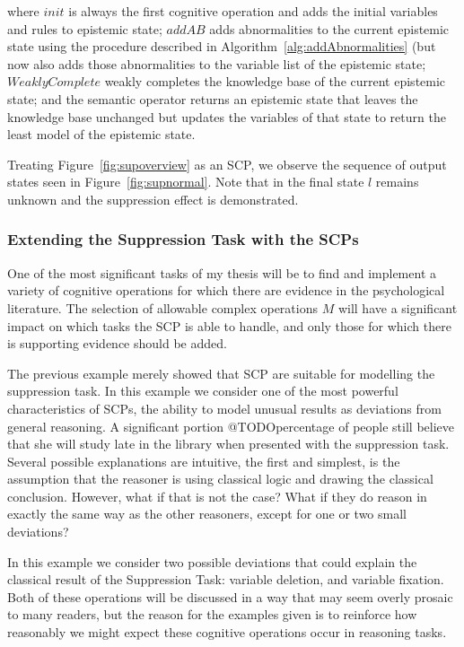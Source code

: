 \documentclass{article}
\begin{document}
where $init$ is always the first cognitive operation and adds the initial variables and rules to epistemic state; $addAB$ adds abnormalities to the current epistemic state using the procedure described in Algorithm~\ref{alg:addAbnormalities} (but now also adds those abnormalities to the variable list of the epistemic state; $Weakly Complete$ weakly completes the knowledge base of the current epistemic state; and the semantic operator returns an epistemic state that leaves the knowledge base unchanged but updates the variables of that state to return the least model of the epistemic state.

Treating Figure~\ref{fig:supoverview} as an SCP, we observe the sequence of output states seen in Figure~\ref{fig:supnormal}. Note that in the final state $l$ remains unknown and the suppression effect is demonstrated.

\subsubsection{Extending the Suppression Task with the SCPs}
One of the most significant tasks of my thesis will be to find and implement a variety of cognitive operations for which there are evidence in the psychological literature. The selection of allowable complex operations $M$ will have a significant impact on which tasks the SCP is able to handle, and only those for which there is supporting evidence should be added.

The previous example merely showed that SCP are suitable for modelling the suppression task. In this example we consider one of the most powerful characteristics of SCPs, the ability to model unusual results as deviations from general reasoning. A significant portion @TODOpercentage of people still believe that she will study late in the library when presented with the suppression task. Several possible explanations are intuitive, the first and simplest, is the assumption that the reasoner is using classical logic and drawing the classical conclusion. However, what if that is not the case? What if they do reason in exactly the same way as the other reasoners, except for one or two small deviations?

In this example we consider two possible deviations that could explain the classical result of the Suppression Task: variable deletion, and variable fixation. Both of these operations will be discussed in a way that may seem overly prosaic to many readers, but the reason for the examples given is to reinforce how reasonably we might expect these cognitive operations occur in reasoning tasks.
\end{document}
